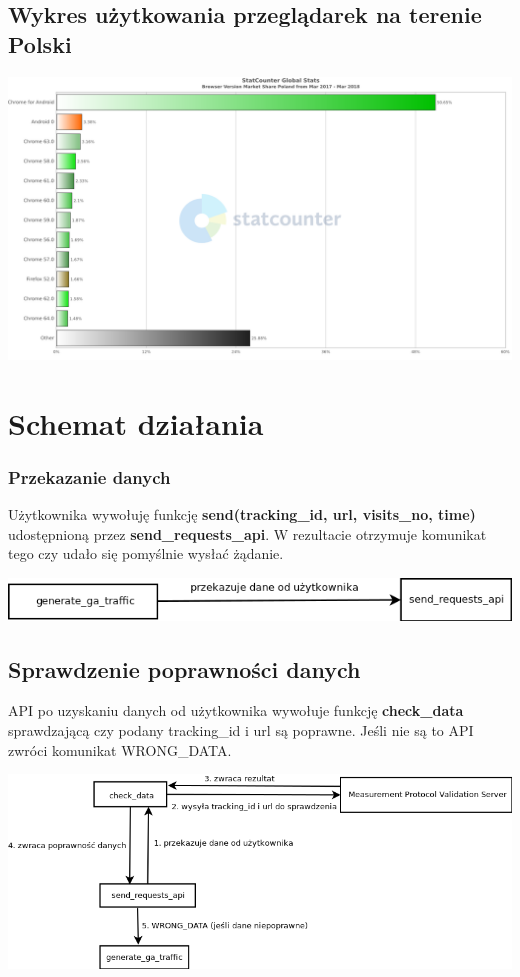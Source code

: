 \documentclass{article}
\begin{document}
\subsection{Wykres użytkowania przeglądarek na terenie Polski}
\begin{center}\includegraphics[scale=0.25]{chart}\end{center}

\section{Schemat działania}

\subsubsection{Przekazanie danych}
Użytkownika wywołuję funkcję \textbf{send(tracking\_id, url, visits\_no, time)} udostępnioną przez \textbf{send\_requests\_api}. W rezultacie otrzymuje komunikat tego czy udało się pomyślnie wysłać żądanie.

\begin{center}\includegraphics[scale=0.5]{put_data}\end{center}

\subsection{Sprawdzenie poprawności danych}
API po uzyskaniu danych od użytkownika wywołuje funkcję \textbf{check\_data} sprawdzającą czy podany tracking\_id i url 
są poprawne. Jeśli nie są to API zwróci komunikat {WRONG\_DATA}.

\begin{center}\includegraphics[scale=0.5]{check_data}\end{center}
\end{document}
